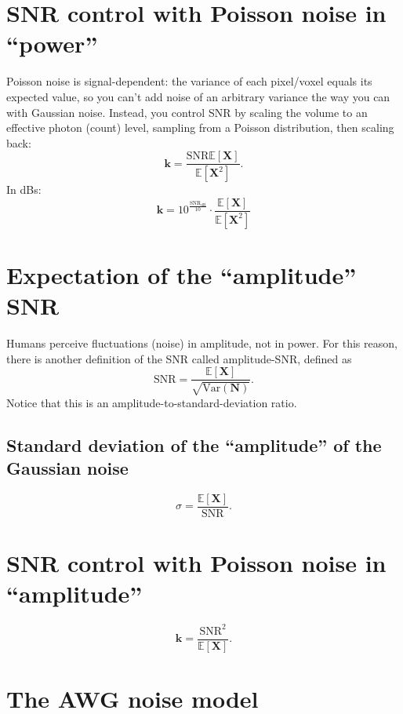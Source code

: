 \section{SNR control with Poisson noise in ``power''}
Poisson noise is signal-dependent: the variance of each pixel/voxel equals
its expected value, so you can't add noise of an arbitrary variance
the way you can with Gaussian noise. Instead, you control SNR by
scaling the volume to an effective photon (count) level, sampling from
a Poisson distribution, then scaling back:
\begin{equation}
  \bm{k} = \frac{\text{SNR}\mathbb{E}[\bm{X}]}{\mathbb{E}[\bm{X}^2]}.
\end{equation}
In dBs:
\begin{equation}
  \bm{k} = 10^{\frac{\text{SNR}_{\text{dB}}}{10}} \cdot \frac{\mathbb{E}[\bm{X}]}{\mathbb{E}[\bm{X}^2]}
\end{equation}

\section{Expectation of the ``amplitude'' \gls{SNR}}
Humans perceive fluctuations (noise) in amplitude, not in power. For
this reason, there is another definition of the \gls{SNR} called
amplitude-\gls{SNR}, defined as
\begin{equation}
  \text{SNR} = \frac{\mathbb{E}[\bm{X}]}{\sqrt{\text{Var}(\bm{N})}}.
  \label{eq:amplitude_SNR_statistics}
\end{equation}
Notice that this is an amplitude-to-standard-deviation ratio.

\subsection{Standard deviation of the ``amplitude'' of the Gaussian noise}
\begin{equation}
  \sigma = \frac{\mathbb{E}[\bm{X}]}{\text{SNR}}.
\end{equation}

\section{SNR control with Poisson noise in ``amplitude''}
\begin{equation}
  \bm{k} = \frac{\text{SNR}^2}{\mathbb{E}[\bm{X}]}.
\end{equation}

\section{The \acrlong{AWG} noise model} %
\label{sec:AWG}

